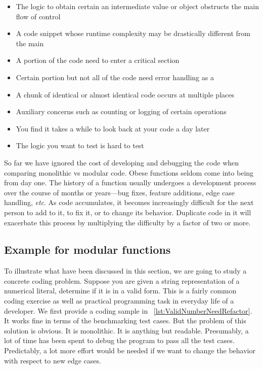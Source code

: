 \begin{itemize}
    \item The logic to obtain certain an intermediate value or object obstructs the main flow of
    control
    \item A code snippet whose runtime complexity may be drastically different from the main
    \item A portion of the code need to enter a critical section
    \item Certain portion but not all of the code need error handling as a 
    \item A chunk of identical or almost identical code occurs at multiple places
    \item Auxiliary concerns such as counting or logging of certain operations
    \item You find it takes a while to look back at your code a day later
    \item The logic you want to test is hard to test
\end{itemize}


So far we have ignored the cost of developing and debugging the code when comparing monolithic
vs modular code.
Obese functions seldom come into being from day one.
The history of a function usually undergoes a development process over the course of
months or years---bug fixes, feature additions, edge case handling, \textit{etc}.
As code accumulates, it becomes increasingly difficult for the next person to add to it, to fix
it, or to change its behavior.
Duplicate code in it will exacerbate this process by multiplying the difficulty by a factor of
two or more.


\subsection{Example for modular functions}\label{subsec:example-for-modular-functions}

To illustrate what have been discussed in this section, we are going to study a concrete
coding problem.
Suppose you are given a string representation of a numerical literal, determine if it is in a valid
form.
This is a fairly common coding exercise as well as practical programming task in everyday life
of a developer.
We first provide a coding sample in ~\autoref{lst:ValidNumberNeedRefactor}.
It works fine in terms of the benchmarking test cases.
But the problem of this solution is obvious.
It is monolithic.
It is anything but readable.
Presumably, a lot of time has been spent to debug the program to pass all the test cases.
Predictably, a lot more effort would be needed if we want to change the behavior
with respect to new edge cases.


